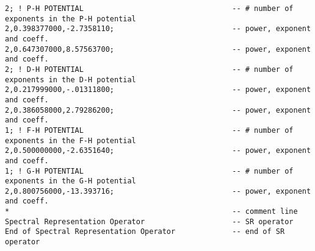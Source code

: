 {\begin{verbatim}
2; ! P-H POTENTIAL                                  -- # number of exponents in the P-H potential
2,0.398377000,-2.7358110;                           -- power, exponent and coeff.
2,0.647307000,8.57563700;                           -- power, exponent and coeff.
2; ! D-H POTENTIAL                                  -- # number of exponents in the D-H potential
2,0.217999000,-.01311800;                           -- power, exponent and coeff.
2,0.386058000,2.79286200;                           -- power, exponent and coeff.
1; ! F-H POTENTIAL                                  -- # number of exponents in the F-H potential
2,0.500000000,-2.6351640;                           -- power, exponent and coeff.
1; ! G-H POTENTIAL                                  -- # number of exponents in the G-H potential
2,0.800756000,-13.393716;                           -- power, exponent and coeff.
*                                                   -- comment line
Spectral Representation Operator                    -- SR operator
End of Spectral Representation Operator             -- end of SR operator
\end{verbatim}
}
